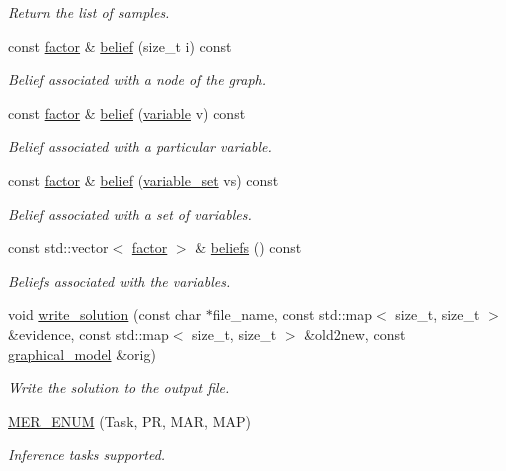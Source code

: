 \begin{DoxyCompactItemize}
\begin{DoxyCompactList}\small\item\em Return the list of samples. \end{DoxyCompactList}\item 
const \hyperlink{classmerlin_1_1factor}{factor} \& \hyperlink{classmerlin_1_1gibbs_a578f69706383e3a29fabc65e8001b433}{belief} (size\+\_\+t i) const 
\begin{DoxyCompactList}\small\item\em Belief associated with a node of the graph. \end{DoxyCompactList}\item 
const \hyperlink{classmerlin_1_1factor}{factor} \& \hyperlink{classmerlin_1_1gibbs_aea5e692a62aee1fff134398565e85c6e}{belief} (\hyperlink{classmerlin_1_1variable}{variable} v) const 
\begin{DoxyCompactList}\small\item\em Belief associated with a particular variable. \end{DoxyCompactList}\item 
const \hyperlink{classmerlin_1_1factor}{factor} \& \hyperlink{classmerlin_1_1gibbs_af8b834f1ca8b2775a2a896b32442e303}{belief} (\hyperlink{classmerlin_1_1variable__set}{variable\+\_\+set} vs) const 
\begin{DoxyCompactList}\small\item\em Belief associated with a set of variables. \end{DoxyCompactList}\item 
const std\+::vector$<$ \hyperlink{classmerlin_1_1factor}{factor} $>$ \& \hyperlink{classmerlin_1_1gibbs_aae4b98aa02e5483d04fed2d9046c0900}{beliefs} () const 
\begin{DoxyCompactList}\small\item\em Beliefs associated with the variables. \end{DoxyCompactList}\item 
void \hyperlink{classmerlin_1_1gibbs_a33dabc870e830525a4bbf3b1559b8dd2}{write\+\_\+solution} (const char $\ast$file\+\_\+name, const std\+::map$<$ size\+\_\+t, size\+\_\+t $>$ \&evidence, const std\+::map$<$ size\+\_\+t, size\+\_\+t $>$ \&old2new, const \hyperlink{classmerlin_1_1graphical__model}{graphical\+\_\+model} \&orig)
\begin{DoxyCompactList}\small\item\em Write the solution to the output file. \end{DoxyCompactList}\item 
\hyperlink{classmerlin_1_1gibbs_ad764ab9776203f568dfdbd4ba9c4b928}{M\+E\+R\+\_\+\+E\+N\+UM} (Task, PR, M\+AR, M\+AP)\hypertarget{classmerlin_1_1gibbs_ad764ab9776203f568dfdbd4ba9c4b928}{}\label{classmerlin_1_1gibbs_ad764ab9776203f568dfdbd4ba9c4b928}

\begin{DoxyCompactList}\small\item\em Inference tasks supported. \end{DoxyCompactList}\end{DoxyCompactItemize}
